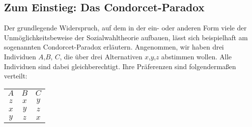 \subsection{Zum Einstieg: Das Condorcet-Paradox}
\label{condorcetParadox}
Der grundlegende Widerspruch, auf dem in der ein- oder anderen Form viele der
Unmöglichkeitsbeweise der Sozialwahltheorie aufbauen, lässt sich beispielhaft
am sogenannten Condorcet-Paradox erläutern. Angenommen, wir haben drei
Individuen $A$,$B$, $C$, die über drei Alternativen
$x$,$y$,$z$ abstimmen wollen. Alle Individuen sind dabei gleichberechtigt. Ihre
Präferenzen sind folgendermaßen verteilt:

\begin{center}
\begin{tabular}{ccc}
\label{condorcetParadoxTabelle}
$A$ & $B$ & $C$ \\
\cline{1-3}
$z$ & $x$ & $y$ \\
$x$ & $y$ & $z$ \\
$y$ & $z$ & $x$ \\
\end{tabular}
\end{center}


